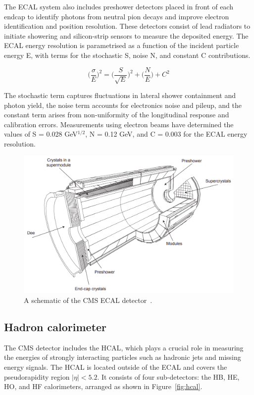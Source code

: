 The \ac{ECAL} system also includes preshower detectors placed in front of each endcap to identify photons from neutral pion decays and improve electron identification and position resolution. 
These detectors consist of lead radiators to initiate showering and silicon-strip sensors to measure the deposited energy. 
The \ac{ECAL} energy resolution is parametrised as a function of the incident particle energy E, with terms for the stochastic S, noise N, and constant C contributions.

\begin{equation}
\Big(\frac{\sigma}{E}\Big)^2 = \Big(\frac{S}{\sqrt{E}}\Big)^2 + \Big( \frac{N}{E} \Big) + C^2
\end{equation}

The stochastic term captures fluctuations in lateral shower containment and photon yield, the noise term accounts for electronics noise and pileup, and the constant term arises from non-uniformity of the longitudinal response and calibration errors. 
Measurements using electron beams have determined the values of S = 0.028 GeV$^{1/2}$, N = 0.12 GeV, and C = 0.003 for the ECAL energy resolution.

\begin{figure}[!hbtp]
    \centering
    \includegraphics[width=\textwidth]{Figures/ECAL.png}
    \caption{A schematic of the CMS ECAL detector~\cite{CMS_Setup}.}
    \label{fig:ecal}
\end{figure}

\subsection{Hadron calorimeter}

The \ac{CMS} detector includes the \ac{HCAL}, which plays a crucial role in measuring the energies of strongly interacting particles such as hadronic jets and missing energy signals. 
The \ac{HCAL} is located outside of the \ac{ECAL} and covers the pseudorapidity region $|\eta| < 5.2$. 
It consists of four sub-detectors: the \ac{HB}, \ac{HE}, \ac{HO}, and \ac{HF} calorimeters, arranged as shown in Figure~\ref{fig:hcal}.

